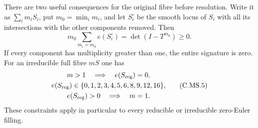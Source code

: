 \begin{proposition}
There are two useful consequences for the original
fibre before resolution. Write it as $\sum_i m_iS_i$,
put $m_0=\min_i m_i$, and let $S_i^\circ$ be the
smooth locus of $S_i$ with all its intersections
with the other components removed. Then
\[
 m_0\sum_{m_i=m_0}e(S_i^\circ)
                    =\det(I-T^{m_0})\ge0.        \tag{C.MS.4}\label{cdp:eq:C.MS.4}
\]
If every component has multiplicity greater than
one, the entire signature is zero. For an
irreducible full fibre $mS$ one has
\[
 \begin{gathered}
 m>1\quad\Longrightarrow\quad e(S_{\rm reg})=0,\\
 e(S_{\rm reg})\in
       \{0,1,2,3,4,5,6,8,9,12,16\},\\
 e(S_{\rm reg})>0\quad\Longrightarrow\quad m=1.
 \end{gathered}                                  \tag{C.MS.5}\label{cdp:eq:C.MS.5}
\]
These constraints apply in particular to every
reducible or irreducible zero-Euler filling.
\end{proposition}
